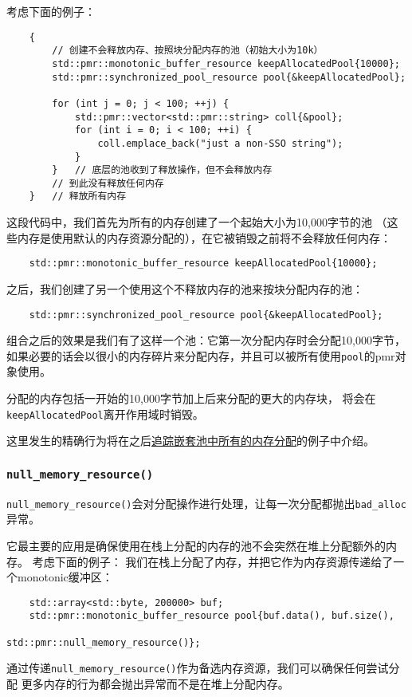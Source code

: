 考虑下面的例子：
\begin{lstlisting}
    {
        // 创建不会释放内存、按照块分配内存的池（初始大小为10k）
        std::pmr::monotonic_buffer_resource keepAllocatedPool{10000};
        std::pmr::synchronized_pool_resource pool{&keepAllocatedPool};

        for (int j = 0; j < 100; ++j) {
            std::pmr::vector<std::pmr::string> coll{&pool};
            for (int i = 0; i < 100; ++i) {
                coll.emplace_back("just a non-SSO string");
            }
        }   // 底层的池收到了释放操作，但不会释放内存
        // 到此没有释放任何内存
    }   // 释放所有内存
\end{lstlisting}
这段代码中，我们首先为所有的内存创建了一个起始大小为10,000字节的池
（这些内存是使用默认的内存资源分配的），在它被销毁之前将不会释放任何内存：
\begin{lstlisting}
    std::pmr::monotonic_buffer_resource keepAllocatedPool{10000};
\end{lstlisting}
之后，我们创建了另一个使用这个不释放内存的池来按块分配内存的池：
\begin{lstlisting}
    std::pmr::synchronized_pool_resource pool{&keepAllocatedPool};
\end{lstlisting}
组合之后的效果是我们有了这样一个池：它第一次分配内存时会分配10,000字节，
如果必要的话会以很小的内存碎片来分配内存，并且可以被所有使用\texttt{pool}的pmr对象使用。

分配的内存包括一开始的10,000字节加上后来分配的更大的内存块，
将会在\texttt{keepAllocatedPool}离开作用域时销毁。

这里发生的精确行为将在之后\hyperref[追踪嵌套池的allocation]{追踪嵌套池中所有的内存分配}的例子中介绍。\label{嵌套池}

\subsubsection{\texttt{null\_memory\_resource()}}
\texttt{null\_memory\_resource()}会对分配操作进行处理，让每一次分配都抛出\texttt{bad\_alloc}异常。

它最主要的应用是确保使用在栈上分配的内存的池不会突然在堆上分配额外的内存。
考虑下面的例子：
我们在栈上分配了内存，并把它作为内存资源传递给了一个monotonic缓冲区：
\begin{lstlisting}
    std::array<std::byte, 200000> buf;
    std::pmr::monotonic_buffer_resource pool{buf.data(), buf.size(),
                                             std::pmr::null_memory_resource()};
\end{lstlisting}
通过传递\texttt{null\_memory\_resource()}作为备选内存资源，我们可以确保任何尝试分配
更多内存的行为都会抛出异常而不是在堆上分配内存。

